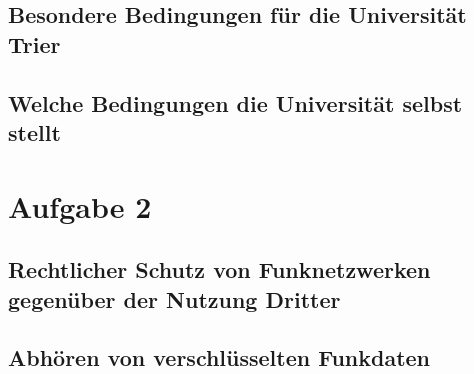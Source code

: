 \documentclass[10pt,a4paper]{article}
\begin{document}
\subsection*{Besondere Bedingungen für die Universität Trier}
\subsection*{Welche Bedingungen die Universität selbst stellt}

\section*{Aufgabe 2}
\subsection*{Rechtlicher Schutz von Funknetzwerken gegenüber der Nutzung Dritter}
\subsection*{Abhören von verschlüsselten Funkdaten}
\end{document}
